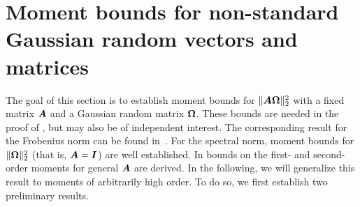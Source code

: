 \appendix

\color{blue}
\section{Moment bounds for non-standard Gaussian random vectors and matrices}

The goal of this section is to establish moment bounds for $\lVert \boldsymbol{A} \boldsymbol{\Omega} \rVert _2^2$ with a fixed matrix $\boldsymbol{A}$ and a Gaussian random matrix $\boldsymbol{\Omega}$. These bounds are needed in the proof of , but may also be of independent interest.
The corresponding result for the Frobenius norm can be found in~\cite[Lemma 3]{kressner-2024-randomized-lowrank}. For the spectral norm, moment bounds for $\lVert \boldsymbol{\Omega} \rVert _2^2$ (that is, $\boldsymbol{A} = \boldsymbol{I}$) are well established\cite{chen-2005-condition-numbers, edelman-1988-eigenvalues-condition, james-1964-distributions-matrix}. In \cite[Lemma B.1]{tropp-2023-randomized-algorithms} bounds on the first- and second-order moments for general $\boldsymbol{A}$ are derived. In the following, we will generalize this result to moments of arbitrarily high order. To do so, we first establish two preliminary results.

